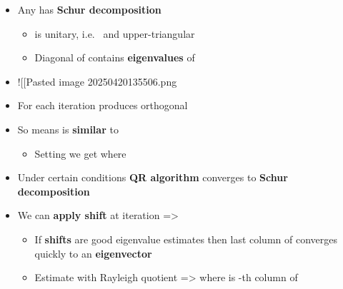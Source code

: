\begin{itemize}

\item
  Any  has \textbf{Schur
  decomposition} 

  \begin{itemize}
  
  \item
     is unitary, i.e.~ and
    upper-triangular 
  \item
    Diagonal of  contains \textbf{eigenvalues} of 
  \end{itemize}
\item
  !{[}{[}Pasted image 20250420135506.png\textbar300{]}{]}
\item
  For  each iteration
   produces orthogonal
\item
  So
  means  is \textbf{similar} to 

  \begin{itemize}
  
  \item
    Setting  we get
     where
  \end{itemize}
\item
  Under certain conditions \textbf{QR algorithm} converges to
  \textbf{Schur decomposition}
\item
  We can \textbf{apply shift}  at iteration 
  =\textgreater{}

  \begin{itemize}
  
  \item
    If \textbf{shifts} are good eigenvalue estimates then last column of
     converges quickly to an \textbf{eigenvector}
  \item
    Estimate  with Rayleigh quotient =\textgreater{}
    where  is -th column of
  \end{itemize}
\end{itemize}